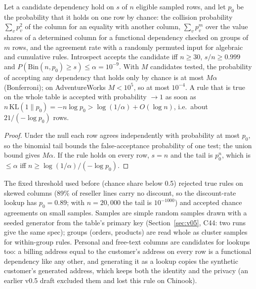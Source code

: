 \begin{proposition}\label{prop:signif}
Let a candidate dependency hold on $s$ of $n$ eligible sampled rows, and let $p_0$ be the probability that it holds on one row by chance: the collision probability $\sum_v p_v^2$ of the column for an equality with another column, $\sum_v p_v^{m}$ over the value shares of a determined column for a functional dependency checked on groups of $m$ rows, and the agreement rate with a randomly permuted input for algebraic and cumulative rules. Introspect accepts the candidate iff $n\ge30$, $s/n\ge0.999$ and $P(\mathrm{Bin}(n,p_0)\ge s)\le\alpha=10^{-9}$. With $M$ candidates tested, the probability of accepting any dependency that holds only by chance is at most $M\alpha$ (Bonferroni); on AdventureWorks $M<10^5$, so at most $10^{-4}$. A rule that is true on the whole table is accepted with probability $\to1$ as soon as $n\,\mathrm{KL}(1\|p_0)=-n\log p_0>\log(1/\alpha)+O(\log n)$, i.e.\ about $21/(-\log p_0)$ rows.
\end{proposition}
\begin{proof}
Under the null each row agrees independently with probability at most $p_0$, so the binomial tail bounds the false-acceptance probability of one test; the union bound gives $M\alpha$. If the rule holds on every row, $s=n$ and the tail is $p_0^n$, which is $\le\alpha$ iff $n\ge\log(1/\alpha)/(-\log p_0)$.
\end{proof}
\noindent The fixed threshold used before (chance share below 0.5) rejected true rules on skewed columns (89\% of reseller lines carry no discount, so the discount-rate lookup has $p_0=0.89$; with $n=20{,}000$ the tail is $10^{-1000}$) and accepted chance agreements on small samples. Samples are simple random samples drawn with a seeded generator from the table's primary key (Section~\ref{sec:v05}, C44: two runs give the same spec); groups (orders, products) are read whole as cluster samples for within-group rules. Personal and free-text columns are candidates for lookups too: a billing address equal to the customer's address on every row is a functional dependency like any other, and generating it as a lookup copies the synthetic customer's generated address, which keeps both the identity and the privacy (an earlier v0.5 draft excluded them and lost this rule on Chinook).

